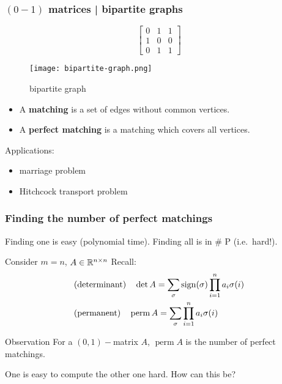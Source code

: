 \documentclass{beamer}
\DeclareMathOperator*{\perm}{perm}
\begin{document}
\begin{frame}
  \frametitle{$(0-1)$ matrices | bipartite graphs}
  \begin{minipage}{0.5\textwidth}
    \begin{equation}
      \begin{bmatrix}
        0 & 1 & 1 \\
        1 & 0 & 0 \\
        0 & 1 & 1
      \end{bmatrix}
    \end{equation}
  \end{minipage}
  \begin{minipage}{0.35\textwidth}
    \begin{figure}[ht]
      \centering
      \texttt{[image: bipartite-graph.png]}
      \caption{bipartite graph}
    \end{figure}
  \end{minipage}

    \begin{definition}
      \begin{itemize}
        \item A \textbf{matching} is a set of edges without common vertices.
        \item A \textbf{perfect matching} is a matching which covers all vertices.
      \end{itemize}
    \end{definition}
    Applications:
    \begin{itemize}
      \item marriage problem
      \item Hitchcock transport problem
    \end{itemize}
\end{frame}

\begin{frame}
  \frametitle{Finding the number of perfect matchings}
  Finding one is easy (polynomial time).
  Finding all is in \# P (i.e.\ hard!).
  \begin{block}{Consider $m=n$, $A\in \mathbb{R}^{n \times n}$}
    Recall:
    \begin{equation}
      \begin{aligned}
        &\text{(determinant)} \quad \det A = \sum_{\sigma} \sign(\sigma) \prod_{i=1}^n a_i \sigma(i) \\
        &\text{(permanent)} \quad \perm A = \sum_{\sigma} \prod_{i=1}^n a_i \sigma(i)
      \end{aligned}
    \end{equation}
  \end{block}
  \begin{block}{Observation}
    For a $(0,1)-$matrix $A$, $\perm A$ is the number of perfect matchings.
  \end{block}
  One is easy to compute the other one hard. How can this be?
\end{frame}
\end{document}
